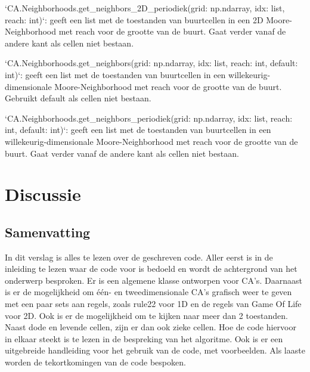 \documentclass{article}
\begin{document}
\begin{markdown}
`CA.Neighborhoods.get_neighbors_2D_periodiek(grid: np.ndarray, idx: list, reach: int)`: geeft een list met de toestanden van buurtcellen in een 2D Moore-Neighborhood met reach voor de grootte van de buurt. Gaat verder vanaf de andere kant als cellen niet bestaan.

`CA.Neighborhoods.get_neighbors(grid: np.ndarray, idx: list, reach: int, default: int)`: geeft een list met de toestanden van buurtcellen in een willekeurig-dimensionale Moore-Neighborhood met reach voor de grootte van de buurt. Gebruikt default als cellen niet bestaan.

`CA.Neighborhoods.get_neighbors_periodiek(grid: np.ndarray, idx: list, reach: int, default: int)`: geeft een list met de toestanden van buurtcellen in een willekeurig-dimensionale Moore-Neighborhood met reach voor de grootte van de buurt. Gaat verder vanaf de andere kant als cellen niet bestaan.
\end{markdown}

\newpage
\section{Discussie}

\subsection{Samenvatting} %
In dit verslag is alles te lezen over de geschreven code. Aller eerst is in de inleiding te lezen waar de code voor is bedoeld en wordt de achtergrond van het onderwerp besproken. \newline
Er is een algemene klasse ontworpen voor CA's. Daarnaast is er de mogelijkheid om één- en tweedimensionale CA's grafisch weer te geven met een paar sets aan regels, zoals rule22 voor 1D en de regels van Game Of Life voor 2D. Ook is er de mogelijkheid om te kijken naar meer dan 2 toestanden. Naast dode en levende cellen, zijn er dan ook zieke cellen.\newline 
Hoe de code hiervoor in elkaar steekt is te lezen in de bespreking van het algoritme.\newline
Ook is er een uitgebreide handleiding voor het gebruik van de code, met voorbeelden.\newline
Als laaste worden de tekortkomingen van de code bespoken.
\end{document}
